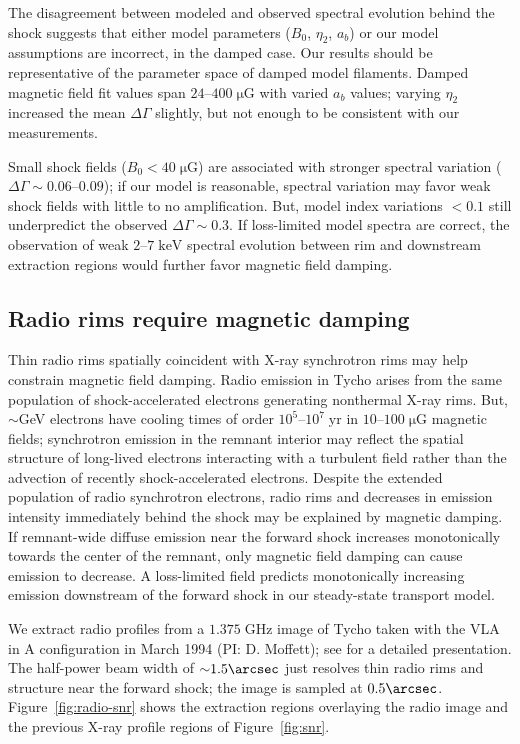 \documentclass[manuscript]{aastex}  %
\newcommand*{\mt}{\mathrm}
\newcommand*{\unit}[1]{\;\mt{#1}}  %
\newcommand*{\abt}{\mathord{\sim}} %
\newcommand*{\muG}{\unit{\mu G}}
\begin{document}
The disagreement between modeled and observed spectral evolution behind the
shock suggests that either model parameters ($B_0$, $\eta_2$, $a_b$) or our
model assumptions are incorrect, in the damped case.
Our results should be representative of the parameter space of damped model
filaments.  Damped magnetic field fit values span $24$--$400 \muG$ with varied
$a_b$ values; varying $\eta_2$ increased the mean $\Delta\Gamma$ slightly, but
not enough to be consistent with our measurements.

Small shock fields ($B_0 < 40 \muG$) are associated with stronger spectral
variation ($\Delta\Gamma \sim 0.06$--$0.09$); if our model is reasonable,
spectral variation may favor weak shock fields with little to no amplification.
But, model index variations $<0.1$ still underpredict the observed
$\Delta\Gamma \sim 0.3$.  If loss-limited model spectra are correct, the
observation of weak $2$--$7 \unit{keV}$ spectral evolution between rim and
downstream extraction regions would further favor magnetic field damping.

\subsection{Radio rims require magnetic damping}

Thin radio rims spatially coincident with X-ray synchrotron rims may help
constrain magnetic field damping.  Radio emission in Tycho arises from the same
population of shock-accelerated electrons generating nonthermal X-ray rims.
But, $\abt$GeV electrons have cooling times of order $10^5$--$10^7 \unit{yr}$
in $10$--$100 \muG$ magnetic fields; synchrotron emission in the remnant
interior may reflect the spatial structure of long-lived electrons interacting
with a turbulent field rather than the advection of recently shock-accelerated
electrons.
Despite the extended population of radio synchrotron electrons, radio rims and
decreases in emission intensity immediately behind the shock may be explained
by magnetic damping.  If remnant-wide diffuse emission near the forward shock
increases monotonically towards the center of the remnant, only magnetic field
damping can cause emission to decrease.  A loss-limited field predicts
monotonically increasing emission downstream of the forward shock in our
steady-state transport model.

We extract radio profiles from a $1.375 \unit{GHz}$ image of Tycho taken
with the VLA in A configuration in March 1994 (PI: D. Moffett); see
\citet{reynoso1997} for a detailed presentation.
The half-power beam width of $\abt 1.5\arcsec$ just resolves thin radio rims
and structure near the forward shock; the image is sampled at $0.5\arcsec$.
Figure~\ref{fig:radio-snr} shows the extraction regions overlaying the radio
image and the previous X-ray profile regions of Figure~\ref{fig:snr}.
\end{document}
